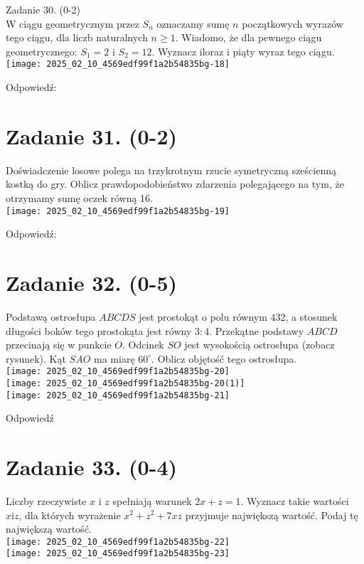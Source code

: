 \documentclass[10pt]{article}
\begin{document}
Zadanie 30. (0-2)\\
W ciągu geometrycznym przez \(S_{n}\) oznaczamy sumę \(n\) początkowych wyrazów tego ciągu, dla liczb naturalnych \(n \geq 1\). Wiadomo, że dla pewnego ciągu geometrycznego: \(S_{1}=2\) i \(S_{2}=12\). Wyznacz iloraz i piąty wyraz tego ciągu.\\
\texttt{[image: 2025\_02\_10\_4569edf99f1a2b54835bg-18]}

Odpowiedź: \(\qquad\)

\section*{Zadanie 31. (0-2)}
Doświadczenie losowe polega na trzykrotnym rzucie symetryczną sześcienną kostką do gry. Oblicz prawdopodobieństwo zdarzenia polegającego na tym, że otrzymamy sumę oczek równą 16.\\
\texttt{[image: 2025\_02\_10\_4569edf99f1a2b54835bg-19]}

Odpowiedź:

\section*{Zadanie 32. (0-5)}
Podstawą ostrosłupa \(A B C D S\) jest prostokąt o polu równym 432, a stosunek długości boków tego prostokąta jest równy \(3: 4\). Przekątne podstawy \(A B C D\) przecinają się w punkcie \(O\). Odcinek \(S O\) jest wysokością ostrosłupa (zobacz rysunek). Kąt \(S A O\) ma miarę \(60^{\circ}\). Oblicz objętość tego ostrosłupa.\\
\texttt{[image: 2025\_02\_10\_4569edf99f1a2b54835bg-20]}\\
\texttt{[image: 2025\_02\_10\_4569edf99f1a2b54835bg-20(1)]}\\
\texttt{[image: 2025\_02\_10\_4569edf99f1a2b54835bg-21]}

Odpowiedź

\section*{Zadanie 33. (0-4)}
Liczby rzeczywiste \(x\) i \(z\) spełniają warunek \(2 x+z=1\). Wyznacz takie wartości \(x \mathrm{i} z\), dla których wyrażenie \(x^{2}+z^{2}+7 x z\) przyjmuje największą wartość. Podaj tę największą wartość.\\
\texttt{[image: 2025\_02\_10\_4569edf99f1a2b54835bg-22]}\\
\texttt{[image: 2025\_02\_10\_4569edf99f1a2b54835bg-23]}
\end{document}
